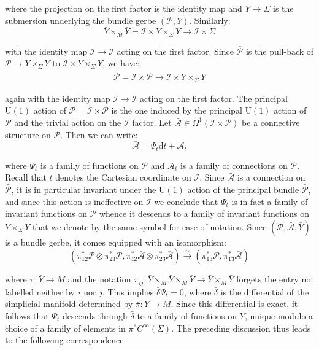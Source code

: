 \documentclass[10pt,reqno,a4paper]{amsart}
\theoremstyle{plain}
\theoremstyle{definition}
\theoremstyle{remark}
\theoremstyle{remark}
\def\dd{\mathrm{d}}
\def\U{\mathrm{U}}
\def\cA{\mathcal{A}}
\def\cI{\mathcal{I}}
\def\cP{\mathcal{P}}
\renewcommand{\(}{ (}
\renewcommand{\)}{ )}
\begin{document}
\noindent
where the projection on the first factor is the identity map and $Y\to \Sigma$ is the submersion underlying the bundle gerbe $(\cP , Y)$. Similarly:
\begin{equation*}
\bar{Y}\times_M  \bar{Y} = \cI\times Y \times_\Sigma Y \to \cI \times \Sigma
\end{equation*}

\noindent
with the identity map $\cI\to \cI$ acting on the first factor. Since $\bar{\cP}$ is the pull-back of $\cP\to Y\times_{\Sigma} Y$ to $\cI \times Y\times_{\Sigma} Y$, we have:
\begin{eqnarray*}
\bar{\cP}= \cI \times \cP \to \cI \times Y\times_{\Sigma} Y
\end{eqnarray*}

\noindent
again with the identity map $\cI\to \cI$ acting on the first factor. The principal $\U(1)$ action of $\bar{\cP} = \cI \times \cP$ is the one induced by the principal $\U(1)$ action of $\cP$ and the trivial action on the $\cI$ factor. Let $\bar{\cA} \in \Omega^1(\cI \times \cP )$ be a connective structure on $\bar{\cP}$. Then we can write:
\begin{equation*}
\bar{\cA} = \Psi_t \dd t + \cA_t
\end{equation*}  

\noindent
where $\Psi_t$ is a family of functions on $\cP$ and $\cA_t$ is a family of connections on $\cP$. Recall that $t$ denotes the Cartesian coordinate on $\cI$. Since $\bar{\cA}$ is a connection on $\bar{\cP}$, it is in particular invariant under the $\U(1)$ action of the principal bundle $\bar{\cP}$, and since this action is ineffective on $\cI$ we conclude that $\Psi_t$ is in fact a family of invariant functions on $\cP$ whence it descends to a family of invariant functions on $Y\times_{\Sigma} Y$ that we denote by the same symbol for ease of notation. Since $(\bar{\cP} , \bar{\cA}, \bar{Y})$ is a bundle gerbe, it comes equipped with an isomorphism:
\begin{equation*}
 (\bar{\pi}^{\ast}_{12}\bar{\cP}\otimes\bar{\pi}^{\ast}_{23}\bar{\cP} , \bar{\pi}^{\ast}_{12}\bar{\cA}\otimes \bar{\pi}^{\ast}_{23}\bar{\cA})  \xrightarrow{\simeq} (\bar{\pi}^{\ast}_{13} \bar{\cP} , \bar{\pi}^{\ast}_{13}\bar{\cA})
\end{equation*}

\noindent
where $\bar{\pi}\colon \bar{Y} \to M$ and the notation $\pi_{ij} \colon \bar{Y}\times_M \bar{Y}\times_M \bar{Y} \to \bar{Y}\times_M \bar{Y}$ forgets the entry not labelled neither by $i$ nor $j$. This implies $\bar{\delta} \Psi_t = 0$, where $\bar{\delta}$ is the differential of the simplicial manifold determined by $\bar{\pi}\colon \bar{Y} \to M$. Since this differential is exact, it follows that $\Psi_t$ descends through $\bar{\delta}$ to a family of functions on $Y$, unique modulo a choice of a family of elements in $\pi^{\ast}C^{\infty}(\Sigma)$. The preceding discussion thus leads to the following correspondence. 
\end{document}
